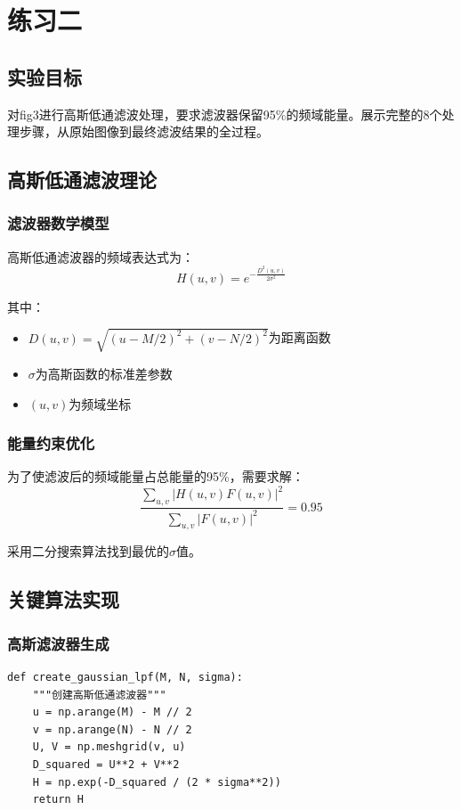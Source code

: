 \documentclass[a4paper]{article}
\begin{document}
\section{练习二}

\subsection{实验目标}

对fig3进行高斯低通滤波处理，要求滤波器保留95\%的频域能量。展示完整的8个处理步骤，从原始图像到最终滤波结果的全过程。

\subsection{高斯低通滤波理论}

\subsubsection{滤波器数学模型}

高斯低通滤波器的频域表达式为：
$$H(u,v) = e^{-\frac{D^2(u,v)}{2\sigma^2}}$$

其中：
\begin{itemize}
    \item $D(u,v) = \sqrt{(u-M/2)^2 + (v-N/2)^2}$为距离函数
    \item $\sigma$为高斯函数的标准差参数
    \item $(u,v)$为频域坐标
\end{itemize}

\subsubsection{能量约束优化}

为了使滤波后的频域能量占总能量的95\%，需要求解：
$$\frac{\sum_{u,v} |H(u,v)F(u,v)|^2}{\sum_{u,v} |F(u,v)|^2} = 0.95$$

采用二分搜索算法找到最优的$\sigma$值。

\subsection{关键算法实现}

\subsubsection{高斯滤波器生成}

\begin{lstlisting}
def create_gaussian_lpf(M, N, sigma):
    """创建高斯低通滤波器"""
    u = np.arange(M) - M // 2
    v = np.arange(N) - N // 2
    U, V = np.meshgrid(v, u)
    D_squared = U**2 + V**2
    H = np.exp(-D_squared / (2 * sigma**2))
    return H
\end{lstlisting}
\end{document}
